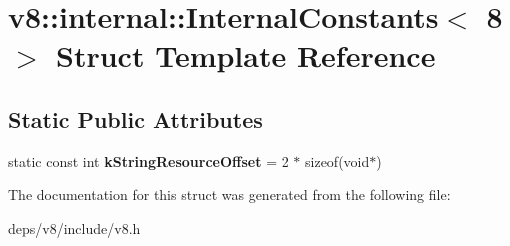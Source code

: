 \hypertarget{structv8_1_1internal_1_1_internal_constants_3_018_01_4}{}\section{v8\+:\+:internal\+:\+:Internal\+Constants$<$ 8 $>$ Struct Template Reference}
\label{structv8_1_1internal_1_1_internal_constants_3_018_01_4}
\subsection*{Static Public Attributes}
\begin{DoxyCompactItemize}
\item 
\hypertarget{structv8_1_1internal_1_1_internal_constants_3_018_01_4_a95faec00d49358d58aafd8cd10257e76}{}static const int {\bfseries k\+String\+Resource\+Offset} = 2 $\ast$ sizeof(void$\ast$)\label{structv8_1_1internal_1_1_internal_constants_3_018_01_4_a95faec00d49358d58aafd8cd10257e76}

\end{DoxyCompactItemize}


The documentation for this struct was generated from the following file\+:\begin{DoxyCompactItemize}
\item 
deps/v8/include/v8.\+h\end{DoxyCompactItemize}

